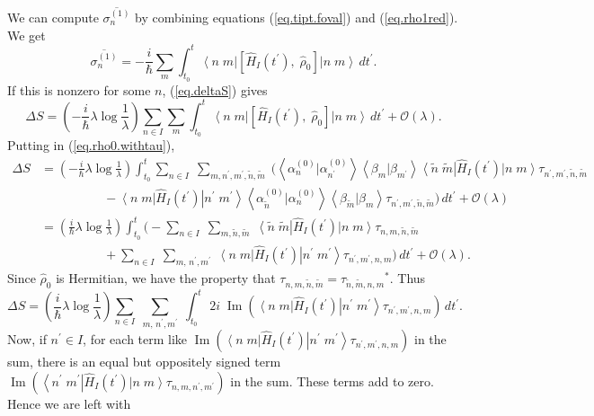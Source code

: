 \documentclass[11pt]{article}
\renewcommand{\Im}{\operatorname{Im}}
\newcommand{\Od}[1]{\mathcal{O}{\left(#1\right)}}
\newcommand{\bra}[1]{\left\langle#1\right|}
\newcommand{\ket}[1]{\left|#1\right\rangle}
\newcommand{\braket}[2]{\left\langle#1|#2\right\rangle}
\newcommand{\op}[1]{\hat{#1}}
\newcommand{\bket}[2]{\ket{#1\;#2}}
\newcommand{\bbra}[2]{\bra{#1\;#2}}
\theoremstyle{theorem}
\theoremstyle{remark}
\theoremstyle{step}
\theoremstyle{gap}
\begin{document}
We can compute \(\overline{\sigma_n^{(1)}}\) by combining equations (\ref{eq.tipt.foval}) and (\ref{eq.rho1red}). We get
\begin{equation}\label{eq.focor}
\overline{\sigma_n^{(1)}} = -\frac{i}{\hbar} \sum_m\int_{t_0}^t \bbra{n}{m} \left[\op{H}_I(t^\prime),\; \op{\rho}_0 \right] \bket{n}{m}\,dt^\prime.
\end{equation}
If this is nonzero for some \(n\), (\ref{eq.deltaS}) gives
\[
\Delta S = \left(-\frac{i}{\hbar}\lambda\log\frac{1}{\lambda}\right) \sum_{n \in I} \sum_m \int_{t_0}^t \bbra{n}{m} \left[\op{H}_I(t^\prime),\; \op{\rho}_0 \right] \bket{n}{m}\,dt^\prime + \Od{\lambda}.
\]
Putting in (\ref{eq.rho0.withtau}),
\begin{align*}
\Delta S &= \left(-\frac{i}{\hbar}\lambda\log\frac{1}{\lambda}\right) \int_{t_0}^t \sum_{n \in I} \;\sum_{m,n^\prime, m^\prime, \tilde{n}, \tilde{m}}\;\Bigg(\braket{\alpha_n^{(0)}}{\alpha_{n^\prime}^{(0)}}\braket{\beta_m}{\beta_{m^\prime}} \bbra{\tilde{n}}{\tilde{m}} \op{H}_I\left(t^\prime\right) \bket{n}{m} \tau_{n^\prime, m^\prime, \tilde{n}, \tilde{m}}\\
&\hspace{5em} - \bbra{n}{m} \op{H}_I\left(t^\prime\right) \bket{n^\prime}{m^\prime} \braket{\alpha_{\tilde{n}}^{(0)}}{\alpha_n^{(0)}}\braket{\beta_{\tilde{m}}}{\beta_{m}} \tau_{n^\prime, m^\prime, \tilde{n}, \tilde{m}}\Bigg) \,dt^\prime + \Od{\lambda} \\
&= \left(\frac{i}{\hbar}\lambda\log\frac{1}{\lambda}\right) \int_{t_0}^t\Bigg( -\sum_{n \in I} \;\sum_{m,\tilde{n}, \tilde{m}}\; \bbra{\tilde{n}}{\tilde{m}} \op{H}_I\left(t^\prime\right) \bket{n}{m} \tau_{n, m, \tilde{n}, \tilde{m}}\\
&\hspace{5em} + \sum_{n \in I} \;\sum_{m,\,n^\prime, m^\prime}\;\bbra{n}{m} \op{H}_I\left(t^\prime\right) \bket{n^\prime}{m^\prime} \tau_{n^\prime, m^\prime, {n}, {m}} \Bigg)\,dt^\prime + \Od{\lambda}.
\end{align*}
Since \(\op{\rho}_0\) is Hermitian, we have the property that \(\tau_{n,m,\tilde{n},\tilde{m}} = {\tau_{\tilde{n},\tilde{m},n,m}}^*\). Thus
\[
\Delta S = \left(\frac{i}{\hbar}\lambda\log\frac{1}{\lambda}\right) \sum_{n \in I} \;\sum_{m,\,n^\prime, m^\prime}\; \int_{t_0}^t\,2i\;\Im\left( \bbra{n}{m}\op{H}_I\left(t^\prime\right) \bket{n^\prime}{m^\prime} \tau_{n^\prime, m^\prime, {n}, {m}} \right)\,dt^\prime.
\]
Now, if \(n^\prime \in I\), for each term like \(\Im\left( \bbra{n}{m} \op{H}_I\left(t^\prime\right) \bket{n^\prime}{m^\prime} \tau_{n^\prime, m^\prime, {n}, {m}} \right)\) in the sum, there is an equal but oppositely signed term \(\Im\left( \bbra{n^\prime}{m^\prime} \op{H}_I\left(t^\prime\right) \bket{n}{m} \tau_{n, m, n^\prime, m^\prime} \right)\) in the sum. These terms add to zero. Hence we are left with
\end{document}
